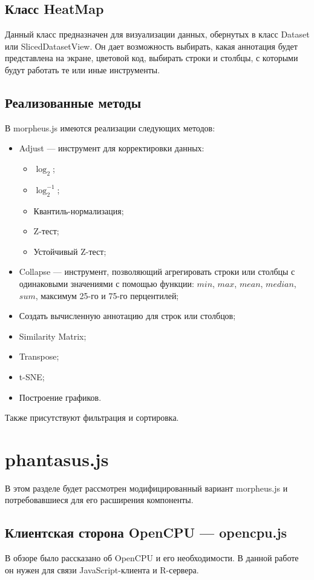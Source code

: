 \documentclass[specification,annotation]{itmo-student-thesis}
\begin{document}
\subsection{Класс HeatMap}
Данный класс предназначен для визуализации данных, обернутых в класс Dataset или SlicedDatasetView. Он дает возможность выбирать, какая аннотация будет представлена на экране, цветовой код, выбирать строки и столбцы, с которыми будут работать те или иные инструменты.

\subsection{Реализованные методы}
В morpheus.js имеются реализации следующих методов:

\begin{itemize}
\item Adjust --- инструмент для корректировки данных:\begin{itemize}
    \item $\log_{2}$;
    \item $\log_{2}^{-1}$;
    \item Квантиль-нормализация;
    \item Z-тест;
    \item Устойчивый Z-тест;\end{itemize}
\item Collapse --- инструмент, позволяющий агрегировать строки или столбцы с одинаковыми значениями с помощью функции: $min$, $max$, $mean$, $median$, $sum$, максимум 25-го и 75-го перцентилей;
\item Создать вычисленную аннотацию для строк или столбцов;
\item Similarity Matrix;
\item Transpose;
\item t-SNE;
\item Построение графиков.
\end{itemize}

Также присутствуют фильтрация и сортировка. 

\section{phantasus.js}
В этом разделе будет рассмотрен модифицированный вариант morpheus.js и потребовавшиеся для его расширения компоненты.
\subsection{Клиентская сторона OpenCPU --- opencpu.js}
В обзоре было рассказано об OpenCPU и его необходимости. В данной работе он нужен для связи JavaScript-клиента и R-сервера.
\end{document}
